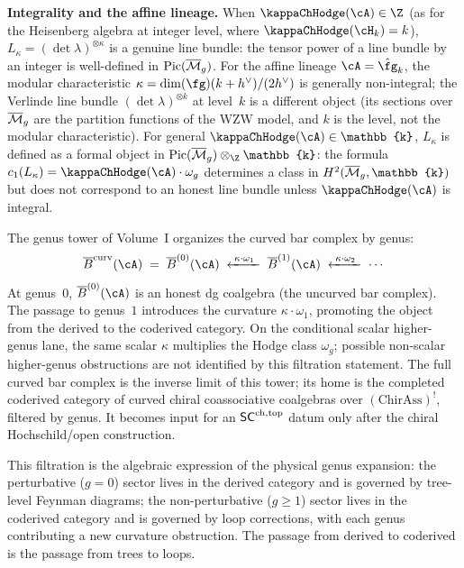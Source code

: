 \begin{construction}
\textbf{Integrality and the affine lineage.}
When $\kappaChHodge(\cA) \in \Z$ (as for the Heisenberg algebra at
integer level, where $\kappaChHodge(\cH_k) = k$),
$L_\kappa = (\det\lambda)^{\otimes\kappa}$ is a
genuine line bundle: the tensor power of a line bundle by an
integer is well-defined in
$\mathrm{Pic}(\overline{\mathcal M}_g)$. For the affine lineage
$\cA = \hat{\fg}_k$, the modular characteristic
$\kappa = \dim(\fg)(k+h^\vee)/(2h^\vee)$ is
generally non-integral; the Verlinde line bundle
$(\det\lambda)^{\otimes k}$ at level~$k$ is a different object
(its sections over $\overline{\mathcal M}_g$ are the partition functions
of the WZW model, and $k$ is the level, not the modular
characteristic). For general $\kappaChHodge(\cA) \in \mathbb{k}$, $L_\kappa$ is
defined as a formal object in
$\mathrm{Pic}(\overline{\cM}_g) \otimes_{\Z} \mathbb{k}$: the
formula $c_1(L_\kappa) = \kappaChHodge(\cA) \cdot \omega_g$ determines a
class in $H^2(\overline{\cM}_g, \mathbb{k})$ but does not
correspond to an honest line bundle unless $\kappaChHodge(\cA)$ is
integral.
\end{construction}

\begin{remark}
\label{rem:genus-tower-coderived}
The genus tower of Volume~I organizes the curved bar complex by
genus:
\[
 \barB^{\mathrm{curv}}(\cA)
 \;=\;
 \barB^{(0)}(\cA)
 \;\xleftarrow{\;\kappa \cdot \omega_1\;}\;
 \barB^{(1)}(\cA)
 \;\xleftarrow{\;\kappa \cdot \omega_2\;}\;
 \cdots
\]
At genus~$0$, $\barB^{(0)}(\cA)$ is an honest dg coalgebra (the
uncurved bar complex). The passage to genus~$1$ introduces the
curvature $\kappa \cdot \omega_1$, promoting the object from the
derived to the coderived category. On the conditional scalar
higher-genus lane, the same scalar $\kappa$ multiplies the Hodge class
$\omega_g$; possible non-scalar higher-genus obstructions are not
identified by this filtration statement. The full curved bar complex is
the inverse limit of this tower; its home is the completed coderived
category of curved chiral coassociative coalgebras over
$(\mathrm{ChirAss})^{!}$, filtered by genus. It becomes input for an
$\mathsf{SC}^{\mathrm{ch},\mathrm{top}}$ datum only after the chiral Hochschild/open construction.

This filtration is the algebraic expression of the physical genus
expansion: the perturbative ($g = 0$) sector lives in the derived
category and is governed by tree-level Feynman diagrams; the
non-perturbative ($g \geq 1$) sector lives in the coderived category
and is governed by loop corrections, with each genus contributing a
new curvature obstruction. The passage from derived to coderived is
the passage from trees to loops.
\end{remark}

